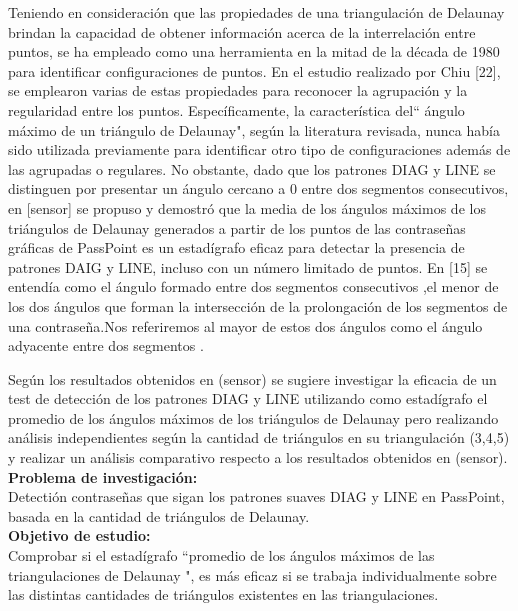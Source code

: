 \documentclass[12pt]{report}
\begin{document}
	Teniendo en consideración que las propiedades de una triangulación de Delaunay brindan la capacidad de obtener información acerca de la interrelación entre puntos, se ha empleado como una herramienta en la mitad de la década de 1980 para identificar configuraciones de puntos. En el estudio realizado por Chiu [22], se emplearon varias de estas propiedades para reconocer la agrupación y la regularidad entre los puntos. Específicamente, la característica del`` ángulo máximo de un triángulo de Delaunay", según la literatura revisada, nunca había sido utilizada previamente para identificar otro tipo de configuraciones además de las agrupadas o regulares. No obstante, dado que los patrones DIAG y LINE se distinguen por presentar un ángulo cercano a 0{\degree } entre dos segmentos consecutivos, en [sensor] se propuso y demostró que la media de los ángulos máximos de los triángulos de Delaunay generados a partir de los puntos de las contraseñas gráficas de PassPoint es un estadígrafo eficaz para detectar la presencia de patrones DAIG y LINE, incluso con un número limitado de puntos.
	En [15] se entendía como el ángulo formado entre dos segmentos consecutivos ,el menor de los dos ángulos que forman la intersección de la prolongación de los segmentos de una contraseña.Nos referiremos al mayor de estos dos ángulos como el ángulo adyacente entre dos segmentos .


	
	Según los resultados obtenidos en (sensor) se sugiere investigar la eficacia de un test de detección de los patrones DIAG y LINE  utilizando como estadígrafo el promedio de los ángulos máximos de los triángulos de Delaunay pero realizando análisis independientes según la cantidad de triángulos en su triangulación (3,4,5) y realizar un análisis comparativo respecto a los resultados obtenidos en (sensor).\\
	
	\large{\textbf{Problema de investigación:}}\\
	\normalsize{	Detectión contraseñas que sigan los patrones suaves DIAG y LINE en PassPoint, basada en la cantidad de triángulos de Delaunay.}\\
	
	\large{\textbf{Objetivo de estudio:}}\\
	\normalsize{Comprobar si el estadígrafo  ``promedio de los ángulos máximos de las triangulaciones de Delaunay ",  es más eficaz si se trabaja individualmente sobre las distintas cantidades de triángulos existentes en las triangulaciones.}\\
	
\end{document}
